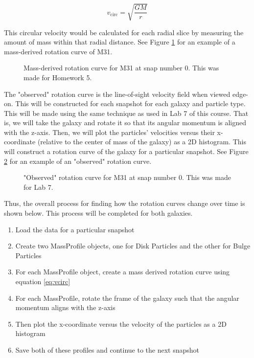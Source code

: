 \documentclass[twocolumn,linenumbers,trackchanges]{aastex7}
\begin{document}
\begin{equation}
	v_{\text{circ}}=\sqrt{\frac{GM}{r}} \label{eq:vcirc}
\end{equation}

This circular velocity would be calculated for each radial slice by measuring the amount of mass within that radial distance.
See Figure \ref{fig:HW5} for an example of a mass-derived rotation curve of M31.

\begin{figure}[ht!]
	\caption{Mass-derived rotation curve for M31 at snap number 0. This was made for Homework 5.}
	\label{fig:HW5}
\end{figure}

The "observed" rotation curve is the line-of-sight velocity field when viewed edge-on. This will be constructed for each snapshot for each galaxy and particle type.
This will be made using the same technique as used in Lab 7 of this course. 
That is, we will take the galaxy and rotate it so that its angular momentum is aligned with the z-axis. 
Then, we will plot the particles' velocities versus their x-coordinate (relative to the center of mass of the galaxy) as a 2D histogram. 
This will construct a rotation curve of the galaxy for a particular snapshot. See Figure \ref{fig:Lab7} for an example of an "observed" rotation curve.

\begin{figure}[ht!]
	\caption{"Observed" rotation curve for M31 at snap number 0. This was made for Lab 7.}
	\label{fig:Lab7}
\end{figure}

Thus, the overall process for finding how the rotation curves change over time is shown below.
This process will be completed for both galaxies.
\begin{enumerate}
	\item Load the data for a particular snapshot
	\item Create two MassProfile objects, one for Disk Particles and the other for Bulge Particles
	\item For each MassProfile object, create a mass derived rotation curve using equation \ref{eq:vcirc}
	\item For each MassProfile, rotate the frame of the galaxy such that the angular momentum aligns with the z-axis
	\item Then plot the x-coordinate versus the velocity of the particles as a 2D histogram
	\item Save both of these profiles and continue to the next snapshot
\end{enumerate}
\end{document}
